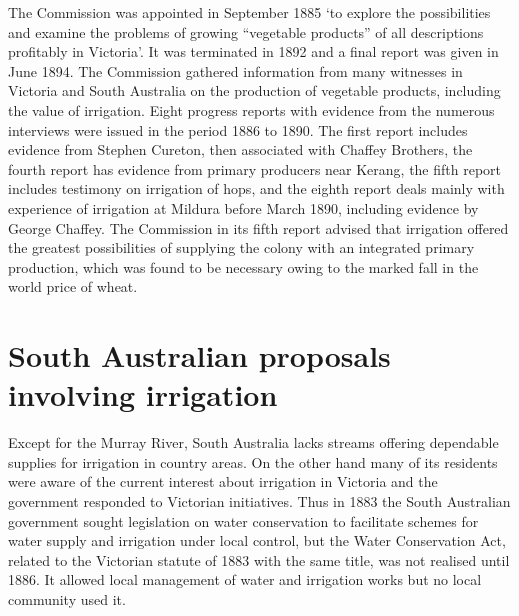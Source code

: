 The Commission was appointed in September 1885 `to explore the
possibilities and examine the problems of growing ``vegetable
products'' of all descriptions profitably in Victoria'.  It was
terminated in 1892 and a final report was given in June 1894.  The
Commission gathered information from many witnesses in Victoria and
South Australia on the production of vegetable products, including the
value of irrigation.  Eight progress reports with evidence from the
numerous interviews were issued in the period 1886 to 1890.  The first
report includes evidence from Stephen Cureton, 
then associated with Chaffey Brothers,  the fourth
report has evidence from primary producers near Kerang, the fifth
report includes testimony on irrigation of hops, and the eighth report
deals mainly with experience of irrigation at Mildura   before March 1890, including evidence by George
Chaffey.   The Commission in its fifth report
advised that irrigation offered the greatest possibilities of
supplying the colony with an integrated primary production, which was
found to be necessary owing to the marked fall in the world price of
wheat.

\section*{South Australian proposals involving irrigation}

Except for the Murray River, South Australia lacks streams offering
dependable supplies for irrigation in country areas.  On the other
hand many of its residents were aware of the current interest about
irrigation in Victoria and the government responded to Victorian
initiatives.  Thus in 1883 the South Australian government sought
legislation on water conservation to facilitate schemes for water
supply and irrigation under local control, but the Water Conservation
Act,  related to the Victorian statute
of 1883 with the same title, was not realised until 1886.  It allowed
local management of water and irrigation works but no local community
used it.

